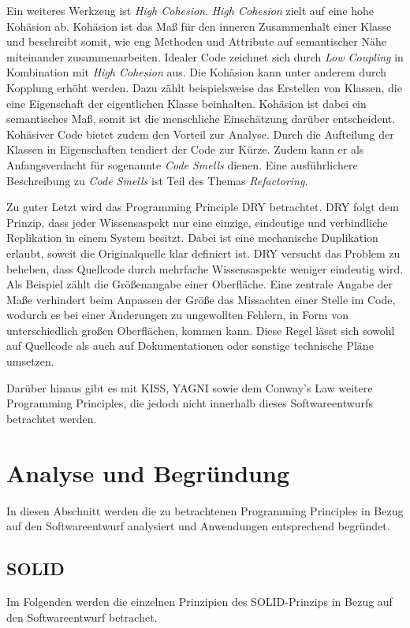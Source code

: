 Ein weiteres Werkzeug ist \textit{High Cohesion}.
\textit{High Cohesion} zielt auf eine hohe Kohäsion ab.
Kohäsion ist das Maß für den inneren Zusammenhalt einer Klasse und beschreibt somit, wie eng Methoden und Attribute auf semantischer Nähe miteinander zusammenarbeiten.
Idealer Code zeichnet sich durch \textit{Low Coupling} in Kombination mit \textit{High Cohesion} aus.
Die Kohäsion kann unter anderem durch Kopplung erhöht werden.
Dazu zählt beispielsweise das Erstellen von Klassen, die eine Eigenschaft der eigentlichen Klasse beinhalten.
Kohäsion ist dabei ein semantisches Maß, somit ist die menschliche Einschätzung darüber entscheident.
Kohäsiver Code bietet zudem den Vorteil zur Analyse.
Durch die Aufteilung der Klassen in Eigenschaften tendiert der Code zur Kürze.
Zudem kann er als Anfangsverdacht für sogenannte \textit{Code Smells} dienen.
Eine ausführlichere Beschreibung zu \textit{Code Smells} ist Teil des Themas \textit{Refactoring}. 

Zu guter Letzt wird das Programming Principle \ac{DRY} betrachtet.
\ac{DRY} folgt dem Prinzip, dass jeder Wissensaspekt nur eine einzige, eindeutige und verbindliche Replikation in einem System besitzt.
Dabei ist eine mechanische Duplikation erlaubt, soweit die Originalquelle klar definiert ist.
\ac{DRY} versucht das Problem zu beheben, dass Quellcode durch mehrfache Wissensaspekte weniger eindeutig wird.
Als Beispiel zählt die Größenangabe einer Oberfläche.
Eine zentrale Angabe der Maße verhindert beim Anpassen der Größe das Missachten einer Stelle im Code, wodurch es bei einer Änderungen zu ungewollten Fehlern, in Form von unterschiedlich großen Oberflächen, kommen kann.
Diese Regel lässt sich sowohl auf Quellcode als auch auf Dokumentationen oder sonstige technische Pläne umsetzen.

Darüber hinaus gibt es mit \ac{KISS}, \ac{YAGNI} sowie dem Conway's Law weitere Programming Principles, die jedoch nicht innerhalb dieses Softwareentwurfs betrachtet werden.

\section{Analyse und Begründung}
In diesen Abschnitt werden die zu betrachtenen Programming Principles in Bezug auf den Softwareentwurf analysiert und Anwendungen entsprechend begründet.

\subsection{SOLID}
Im Folgenden werden die einzelnen Prinzipien des SOLID-Prinzips in Bezug auf den Softwareentwurf betrachet.

